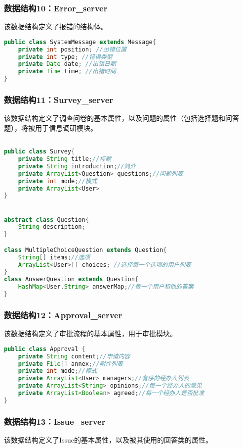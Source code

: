 \subsubsection{数据结构10：Error\_server}
该数据结构定义了报错的结构体。
\begin{lstlisting}[language=Java, caption=Error定义]
public class SystemMessage extends Message{
    private int position; //出错位置
    private int type; //错误类型
    private Date date; //出错日期
    private Time time; //出错时间
}
\end{lstlisting}


{\color{red}

\subsubsection{数据结构11：Survey\_server}
该数据结构定义了调查问卷的基本属性，以及问题的属性（包括选择题和问答题），将被用于信息调研模块。
\begin{lstlisting}[language=Java, caption=Survey定义]

public class Survey{
    private String title;//标题
    private String introduction;//简介
    private ArrayList<Question> questions;//问题列表
    private int mode;//模式
    private ArrayList<User>  
}


abstract class Question{
    String description;
}

class MultipleChoiceQuestion extends Question{
    String[] items;//选项
    ArrayList<User>[] choices; //选择每一个选项的用户列表
}
class AnswerQuestion extends Question{
    HashMap<User,String> answerMap;//每一个用户和他的答案
}
\end{lstlisting}

\subsubsection{数据结构12：Approval\_server}
该数据结构定义了审批流程的基本属性，用于审批模块。
\begin{lstlisting}[language=Java, caption=Approval定义]
public class Approval {
    private String content;//申请内容
    private File[] annex;//附件列表
    private int mode;//模式
    private ArrayList<User> managers;//有序的经办人列表
    private ArrayList<String> opinions;//每一个经办人的意见
    private ArrayList<Boolean> agreed;//每一个经办人是否批准
}
\end{lstlisting}

\subsubsection{数据结构13：Issue\_server}
该数据结构定义了Issue的基本属性，以及被其使用的回答类的属性。

}
